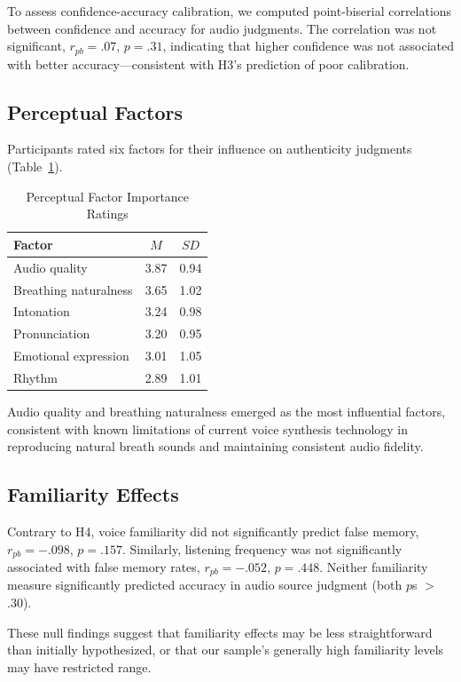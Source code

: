 \documentclass[12pt, a4paper]{article}
\begin{document}
To assess confidence-accuracy calibration, we computed point-biserial correlations between confidence and accuracy for audio judgments. The correlation was not significant, $r_{pb} = .07$, $p = .31$, indicating that higher confidence was not associated with better accuracy---consistent with H3's prediction of poor calibration.

\subsection{Perceptual Factors}

Participants rated six factors for their influence on authenticity judgments (Table~\ref{tab:factors}).

\begin{table}[H]
\centering
\caption{Perceptual Factor Importance Ratings}
\begin{tabular}{lcc}
\toprule
Factor & $M$ & $SD$ \\
\midrule
Audio quality  & 3.87 & 0.94 \\
Breathing naturalness  & 3.65 & 1.02 \\
Intonation  & 3.24 & 0.98 \\
Pronunciation  & 3.20 & 0.95 \\
Emotional expression  & 3.01 & 1.05 \\
Rhythm  & 2.89 & 1.01 \\
\bottomrule
\end{tabular}
\label{tab:factors}
\end{table}

Audio quality and breathing naturalness emerged as the most influential factors, consistent with known limitations of current voice synthesis technology in reproducing natural breath sounds and maintaining consistent audio fidelity.

\subsection{Familiarity Effects}

Contrary to H4, voice familiarity did not significantly predict false memory, $r_{pb} = -.098$, $p = .157$. Similarly, listening frequency was not significantly associated with false memory rates, $r_{pb} = -.052$, $p = .448$. Neither familiarity measure significantly predicted accuracy in audio source judgment (both $p$s $>$ .30).

These null findings suggest that familiarity effects may be less straightforward than initially hypothesized, or that our sample's generally high familiarity levels may have restricted range.
\end{document}
